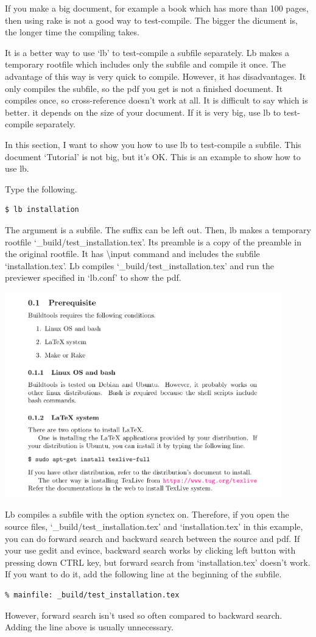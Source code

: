 If you make a big document, for example a book which has more than 100 pages, then using rake is not a good way to test-compile.
The bigger the dicument is, the longer time the compiling takes.

It is a better way to use `lb' to test-compile a subfile separately.
Lb makes a temporary rootfile which includes only the subfile and compile it once.
The advantage of this way is very quick to compile.
However, it has disadvantages.
It only compiles the subfile, so the pdf you get is not a finished document.
It compiles once, so cross-reference doesn't work at all.
It is difficult to say which is better.
it depends on the size of your document.
If it is very big, use lb to test-compile separately.

In this section, I want to show you how to use lb to test-compile a subfile.
This document `Tutorial' is not big, but it's OK.
This is an example to show how to use lb.

Type the following.
\begin{verbatim}
$ lb installation
\end{verbatim}
The argument is a subfile.
The suffix can be left out.
Then, lb makes a temporary rootfile `\_build/test\_installation.tex'.
Its preamble is a copy of the preamble in the original rootfile.
It has {\textbackslash}input command and includes the subfile `installation.tex'.
Lb compiles `\_build/test\_installation.tex' and run the previewer specified in `lb.conf' to show the pdf.
\begin{center}
\includegraphics[width=12cm]{test_installation.png}
\end{center}

Lb compiles a subfile with the option synctex on.
Therefore, if you open the source files, `\_build/test\_installation.tex' and `installation.tex' in this example, you can do forward search and backward search between the source and pdf.
If your use gedit and evince, backward search works by clicking left button with pressing down CTRL key, but forward search from `installation.tex' doesn't work.
If you want to do it, add the following line at the beginning of the subfile.
\begin{verbatim}
% mainfile: _build/test_installation.tex
\end{verbatim}
However, forward search isn't used so often compared to backward search.
Adding the line above is usually unnecessary.

